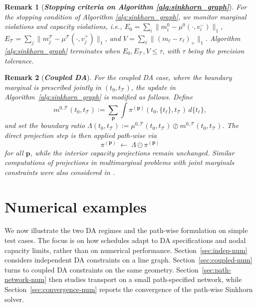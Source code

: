 \documentclass[11pt]{article}
\newcommand{\calT}{{\mathcal T}}
\newcommand{\bp}{{\mathbf p}}
\newtheorem{remark}{Remark}
\begin{document}
\begin{remark}[\bf \textit{Stopping criteria on Algorithm \ref{alg:sinkhorn_graph}}]
For the stopping condition of Algorithm \ref{alg:sinkhorn_graph}, we monitor marginal violations and capacity violations, i.e.,
$E_0=\sum_i\|m^0_i-\mu^0(\cdot,v^-_i)\|_1$,
$E_{\calT}=\sum_j\|m^{\calT}_j-\mu^{\calT}(\cdot,v^+_j)\|_1$, and
$V=\sum_\ell\|(m_\ell-r_\ell)_+\|_1$. 
Algorithm \ref{alg:sinkhorn_graph} terminates when $E_0, E_{\calT}, V\le\tau$, with $\tau$ being the precision tolerance. 
\end{remark}




\begin{remark}[\bf \textit{Coupled DA}]
For the coupled DA case, where the boundary marginal is prescribed jointly in $(t_0,t_{\mathcal T})$, the update in Algorithm~\ref{alg:sinkhorn_graph} is modified as follows. Define 
$$m^{0,\mathcal T}(t_0,t_{\mathcal T})
:= \sum_{\bp}\int \pi^{(\bp)}(t_0,\{t_\ell\},t_{\mathcal T})\,d\{t_\ell\},$$ and set the boundary ratio $\Lambda(t_0,t_{\mathcal T}) := \mu^{0,\mathcal T}(t_0,t_{\mathcal T}) \oslash m^{0,\mathcal T}(t_0,t_{\mathcal T})$. The direct projection step is then applied path-wise via 
$$\pi^{(\bp)} \;\leftarrow\; \Lambda \odot \pi^{(\bp)}$$
for all $\bp$, while the interior capacity projections remain unchanged. Similar computations of projections in multimarginal problems with joint marginals constraints were also considered in  \cite{haasler2020optimal,haasler2024scalable}.


\end{remark}
  



\section{Numerical examples}\label{sec:num}
We now illustrate the two DA regimes and the path-wise formulation on simple test cases. The focus is on how schedules adapt to DA specifications and nodal capacity limits, rather than on numerical performance. Section~\ref{sec:indep-num} considers independent DA constraints on a line graph. Section~\ref{sec:coupled-num} turns to coupled DA constraints on the same geometry. Section~\ref{sec:path-network-num} then studies transport on a small path-specified network, while Section~\ref{sec:convergence-num} reports the convergence of the path-wise Sinkhorn solver.
\end{document}
